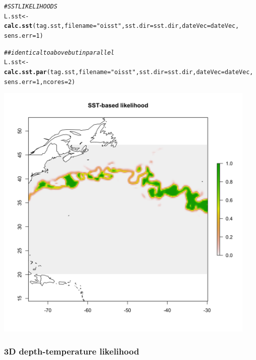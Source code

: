 \documentclass{article}\usepackage[]{graphicx}\usepackage[]{color}
\makeatletter
\newcommand{\hlnum}[1]{\textcolor[rgb]{0.686,0.059,0.569}{#1}}%
\newcommand{\hlstr}[1]{\textcolor[rgb]{0.192,0.494,0.8}{#1}}%
\newcommand{\hlcom}[1]{\textcolor[rgb]{0.678,0.584,0.686}{\textit{#1}}}%
\newcommand{\hlstd}[1]{\textcolor[rgb]{0.345,0.345,0.345}{#1}}%
\newcommand{\hlkwb}[1]{\textcolor[rgb]{0.69,0.353,0.396}{#1}}%
\newcommand{\hlkwc}[1]{\textcolor[rgb]{0.333,0.667,0.333}{#1}}%
\newcommand{\hlkwd}[1]{\textcolor[rgb]{0.737,0.353,0.396}{\textbf{#1}}}%
\newenvironment{kframe}{%
 \def\at@end@of@kframe{}%
 \ifinner\ifhmode%
  \def\at@end@of@kframe{\end{minipage}}%
  \begin{minipage}{\columnwidth}%
 \fi\fi%
 \def\FrameCommand##1{\hskip\@totalleftmargin \hskip-\fboxsep
 \colorbox{shadecolor}{##1}\hskip-\fboxsep
     \hskip-\linewidth \hskip-\@totalleftmargin \hskip\columnwidth}%
 \MakeFramed {\advance\hsize-\width
   \@totalleftmargin\z@ \linewidth\hsize
   \@setminipage}}%
 {\par\unskip\endMakeFramed%
 \at@end@of@kframe}
\newenvironment{knitrout}{}{} %
\makeatother
\begin{document}
\begin{knitrout}\small
{}\color{fgcolor}\begin{kframe}
\begin{alltt}
\hlcom{# SST LIKELIHOODS}
\hlstd{L.sst} \hlkwb{<-} \hlkwd{calc.sst}\hlstd{(tag.sst,} \hlkwc{filename} \hlstd{=} \hlstr{"oisst"}\hlstd{,} \hlkwc{sst.dir} \hlstd{= sst.dir,} \hlkwc{dateVec} \hlstd{= dateVec,}
    \hlkwc{sens.err} \hlstd{=} \hlnum{1}\hlstd{)}

\hlcom{## identical to above but in parallel}
\hlstd{L.sst} \hlkwb{<-} \hlkwd{calc.sst.par}\hlstd{(tag.sst,} \hlkwc{filename} \hlstd{=} \hlstr{"oisst"}\hlstd{,} \hlkwc{sst.dir} \hlstd{= sst.dir,} \hlkwc{dateVec} \hlstd{= dateVec,}
    \hlkwc{sens.err} \hlstd{=} \hlnum{1}\hlstd{,} \hlkwc{ncores} \hlstd{=} \hlnum{2}\hlstd{)}
\end{alltt}
\end{kframe}
\end{knitrout}


\includegraphics[width=5in, keepaspectratio]{./example_sst_lik.png}


\subsubsection{3D depth-temperature likelihood}
\end{document}
